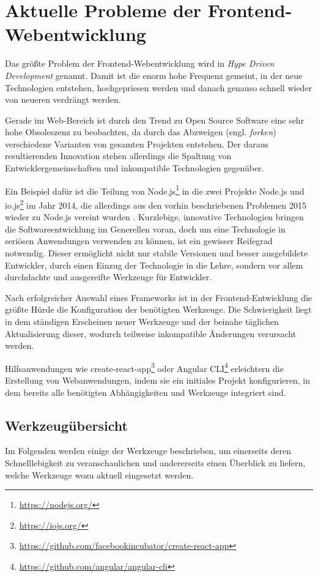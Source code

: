 \chapter{Aktuelle Probleme der Frontend-Webentwicklung}
\label{cha:frontend-problems}

Das größte Problem der Frontend-Webentwicklung wird in \autocite{Kirejczyk.HDD:online} \emph{Hype Driven Development} genannt.
Damit ist die enorm hohe Frequenz gemeint, in der neue Technologien entstehen, hochgepriesen werden und danach genauso schnell wieder von neueren verdrängt werden.

Gerade im Web-Bereich ist durch den Trend zu Open Source Software eine sehr hohe Obsoleszenz zu beobachten, da durch das Abzweigen (engl. \emph{forken}) verschiedene Varianten von gesamten Projekten entstehen.
Der daraus resultierenden Innovation stehen allerdings die Spaltung von Entwicklergemeinschaften und inkompatible Technologien gegenüber.

Ein Beispiel dafür ist die Teilung von Node.js\footnote{\url{https://nodejs.org/}} in die zwei Projekte Node.js und io.js\footnote{\url{https://iojs.org/}} im Jahr 2014, die allerdings aus den vorhin beschriebenen Problemen 2015 wieder zu Node.js vereint wurden \autocite{Node.io-node-merge:online}.
Kurzlebige, innovative Technologien bringen die Softwareentwicklung im Generellen voran, doch um eine Technologie in seriösen Anwendungen verwenden zu können, ist ein gewisser Reifegrad notwendig.
Dieser ermöglicht nicht nur stabile Versionen und besser ausgebildete Entwickler, durch einen Einzug der Technologie in die Lehre, sondern vor allem durchdachte und ausgereifte Werkzeuge für Entwickler.

Nach erfolgreicher Auswahl eines Frameworks ist in der Frontend-Entwicklung die größte Hürde die Konfiguration der benötigten Werkzeuge.
Die Schwierigkeit liegt in dem ständigen Erscheinen neuer Werkzeuge und der beinahe täglichen Aktualisierung dieser, wodurch teilweise inkompatible Änderungen verursacht werden.

Hilfsanwendungen wie create-react-app\footnote{\url{https://github.com/facebookincubator/create-react-app}} oder Angular CLI\footnote{\url{https://github.com/angular/angular-cli}} erleichtern die Erstellung von Webanwendungen, indem sie ein initiales Projekt konfigurieren, in dem bereits alle benötigten Abhängigkeiten und Werkzeuge integriert sind.


\section{Werkzeugübersicht}
\label{sec:tools-overview}
Im Folgenden werden einige der Werkzeuge beschrieben, um einerseits deren Schnelllebigkeit zu veranschaulichen und andererseits einen Überblick zu liefern, welche Werkzeuge wozu aktuell eingesetzt werden.

